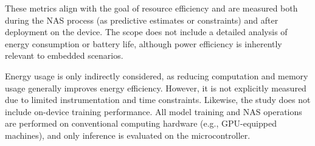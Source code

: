 These metrics align with the goal of resource efficiency and are measured both during the NAS process (as predictive estimates or constraints) and after deployment on the device. The scope does not include a detailed analysis of energy consumption or battery life, although power efficiency is inherently relevant to embedded scenarios.


Energy usage is only indirectly considered, as reducing computation and memory usage generally improves energy efficiency. However, it is not explicitly measured due to limited instrumentation and time constraints. Likewise, the study does not include on-device training performance. All model training and NAS operations are performed on conventional computing hardware (e.g., GPU-equipped machines), and only inference is evaluated on the microcontroller.


